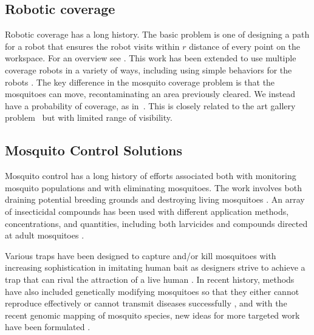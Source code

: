 \documentclass[letterpaper, 10 pt, conference]{ieeeconf}  %
\begin{document}
      \subsection{Robotic coverage}
    Robotic coverage has a long history. The basic problem is one of designing a path for a robot that ensures the robot visits within $r$ distance of every point on the workspace.  For an overview see \cite{Choset2001}.  This work has been extended to use multiple coverage robots in a variety of ways, including using simple behaviors for the robots \cite{spears2006physics,Koenig2001}.
    The key difference in the mosquito coverage problem is that the mosquitoes can move, recontaminating an area previously cleared. We instead have a probability of coverage, as in~\cite{Das2011}.  This is closely related to the art gallery problem~\cite{lee1986computational} but with limited range of visibility.
    
  \subsection{Mosquito Control Solutions}
  
	Mosquito control has a long history of efforts associated both with monitoring mosquito populations \cite{dennett2007associations} and with eliminating mosquitoes.  The work involves both draining potential breeding grounds and destroying living mosquitoes \cite{peter2005tick}.  An array of insecticidal compounds has been used with different application methods, concentrations, and quantities, including both larvicides and compounds directed at adult mosquitoes \cite{larvicides2005guidelines}.
	
	Various traps have been designed to capture and/or kill mosquitoes with increasing sophistication in imitating human bait as designers strive to achieve a trap that can rival the attraction of a live human \cite{maliti2015development}.  In recent history, methods have also included genetically modifying mosquitoes so that they either cannot reproduce effectively or cannot transmit diseases successfully \cite{marshall2009malaria}, and with the recent genomic mapping of mosquito species, new ideas for more targeted work have been formulated \cite{hill2005arthropod}.
	
\end{document}
